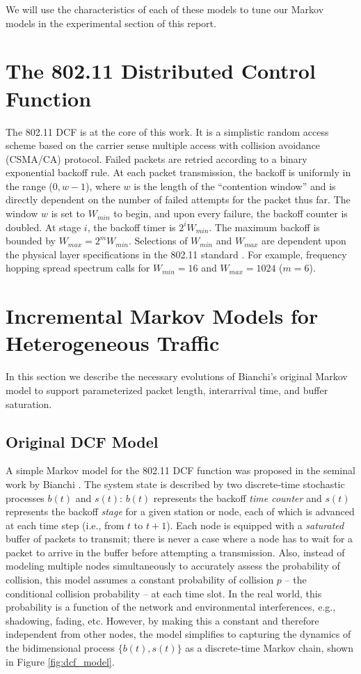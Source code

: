 \documentclass{llncs}
\begin{document}
We will use the characteristics of each of these models to tune our Markov models in the experimental section of this report. 

\section{The 802.11 Distributed Control Function}
The 802.11 DCF \cite{ieee1997wireless} is at the core of this work. It is a simplistic random access scheme based on the carrier sense multiple access with collision avoidance (CSMA/CA) protocol. Failed packets are retried according to a binary exponential backoff rule. At each packet transmission, the backoff is uniformly in the range ($0, w-1$), where $w$ is the length of the ``contention window'' and is directly dependent on the number of failed attempts for the packet thus far. The window $w$ is set to $W_{min}$ to begin, and upon every failure, the backoff counter is doubled. At stage $i$, the backoff timer is $2^iW_{min}$. The maximum backoff is bounded by $W_{max} = 2^mW_{min}$. Selections of $W_{min}$ and $W_{max}$ are dependent upon the physical layer specifications in the 802.11 standard \cite{ieee1997wireless,dcf}. For example, frequency hopping spread spectrum calls for $W_{min} = 16$ and $W_{max} = 1024$ ($m = 6$). 

\section{Incremental Markov Models for Heterogeneous Traffic}
In this section we describe the necessary evolutions of Bianchi's original Markov model to support parameterized packet length, interarrival time, and buffer saturation.

\subsection{Original DCF Model}
A simple Markov model for the 802.11 DCF function was proposed in the seminal work by Bianchi \cite{dcf}. The system state is described by two discrete-time stochastic processes $b(t)$ and $s(t)$: $b(t)$ represents the backoff \emph{time counter} and $s(t)$ represents the backoff \emph{stage} for a given station or node, each of which is advanced at each time step (i.e., from $t$ to $t + 1$). Each node is equipped with a \emph{saturated} buffer of packets to transmit; there is never a case where a node has to wait for a packet to arrive in the buffer before attempting a transmission. Also, instead of modeling multiple nodes simultaneously to accurately assess the probability of collision, this model assumes a constant probability of collision $p$ -- the conditional collision probability -- at each time slot. In the real world, this probability is a function of the network and environmental interferences, e.g., shadowing, fading, etc. However, by making this a constant and therefore independent from other nodes, the model simplifies to capturing the dynamics of the bidimensional process $\{ b(t), s(t) \}$ as a discrete-time Markov chain, shown in Figure \ref{fig:dcf_model}. 
\end{document}
